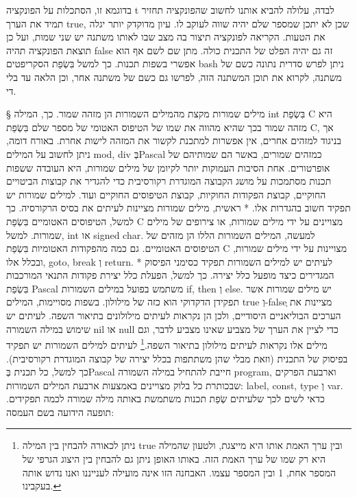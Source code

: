       בדוגמא זו, הסתכלות על הפונקציה t לבדה, עלולה להביא אותנו לחשוב שהפונקציה תחזיר
      תמיד את הערך true, שכן לא יתכן שמספר שלם יהיה שווה לעוקב לו. עיון מדוקדק יותר
      יגלה את הטעות. הקריאה לפונקציה תיצור בה מצב שבו לאותו משתנה יש שני שמות, ועל כן
      תוצאת הפונקציה תהיה false זה גם יהיה הפלט של התכנית כולה.  מתן שם לשם אף הוא
      אפשרי בשפות תכנות. כך למשל בִּשְׂפַת  הסקריפטים bash ניתן לפרש סדרית נתונה כשם של
      משתנה, לקרוא את תוכן המשתנה הזה, לפרשו גם כשם של משתנה אחר, וכן הלאה עד בלי די.

      § מילים שמורות
      מקצת מהמילים השמורות הן מזהה שמור. כך, המילה int בִּשְׂפַת C היא מזהה שמור בכך שהיא מהווה את שמו של הטיפוס האטומי של מספר שלם בִּשְׂפַת C, אך בניגוד למזהים אחרים, אין אפשרות למתכנת לקשור את המזהה לישות אחרת.
      באורח דומה, ניתן לחשוב על המילים mod, div בְּPascal כמזהים שמורים, באשר הם שמותיהם של אופרטורים.
      אחת הסיבות העמוקות יותר לקיומן של מילים שמורות, היא העובדה ששפות תכנות מסתמכות על מושג הקבוצה המוגדרת רקורסיבית כדי להגדיר את קבוצות הביטויים החוקיים, קבוצת הפקודות החוקיות, קבוצת הטיפוסים החוקיים ועוד.
      למילים שמורות יש תפקיד חשוב בהגדרות אלו.
      * ראשית, מילים שמורות מציינות לעיתים את בסיס הרקורסיה. כך למשל, הטיפוסים האטומיים בִּשְׂפַת C מצויינים על ידי מילים שמורות, או צירופים של מילים שמורות. למשל, int או signed char. למעשה, המילים השמורות הללו הן מזהים של הטיפוסים האטומיים. גם כמה מהפקודות האטומיות בִּשְׂפַת C מצויינות על ידי מילים שמורות, ובכלל אלו, goto, break וְ return.
      * לעיתים יש למילים השמורות תפקיד כסימני הפיסוק המגדירים כיצד מופעל כלל יצירה. כך למשל, הפעלת כלל יצירת פקודות התנאי המורכבות בִּשְׂפַת   Pascal משתמש בפועל במילים השמורות if, then וְ else.
      יש מילים שמורות אשר תפקידן הדקדוקי הוא כזה של מילולון. בשפות מסויימות, המילים true וְ-falseְ מציינות את הערכים הבוליאניים היסודיים, ולכן הן נקראות לעיתים מילולונים בתיאור השפה. לעיתים יש שימוש במילה השמורה nil או null כדי לציין את הערך של מצביע שאינו מצביע לדבר, וגם מילים אלו נקראות לעיתים מילולון בתיאור השפה.\footnote{ניתן לכאורה להבחין בין המילה true ובין ערך האמת אותו היא מייצגת, ולטעון שהמילה היא רק שמו של ערך האמת הזה. באותו האופן ניתן גם להבחין בין היצוג הגרפי של המספר אחת, 1 ובין המספר עצמו. האבחנה הזו אינה מועילה לענייננו ואנו נדוש אותה בעקבינו.}
      לעיתים למילים השמורות יש תפקיד בפיסוק של התכנית (וזאת מבלי שהן משתתפות בכלל יצירה של קבוצה המוגדרת רקורסיבית). כך למשל, כל תכנית בְּPascal חייבת להתחיל במילה השמורה program, וארבעת הפרקים שבכותרת כל בלוק מצויינים באמצעות ארבעת המילים השמורות: label, const, type וְ var.
      כדאי לשים לכך שלעיתים שְׂפַת תכנות משתמשת באותה מילה שמורה לכמה תפקידים. תופעה הידועה בשם העמסה:
